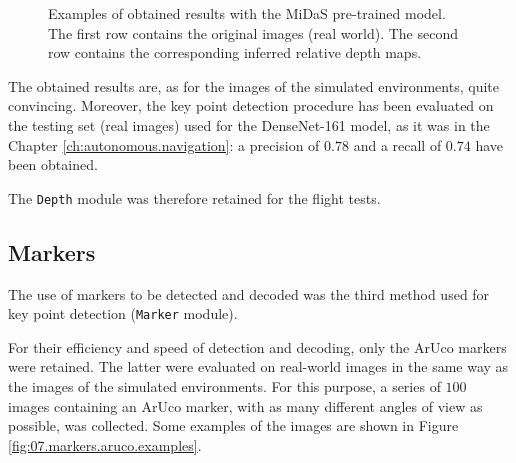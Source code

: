 \begin{figure}[H]
\begin{subfigure}{0.32\textwidth}
    \end{subfigure}
    \caption{Examples of obtained results with the MiDaS pre-trained model. The first row contains the original images (real world). The second row contains the corresponding inferred relative depth maps.}
    \label{fig:07.depth.results.examples}
\end{figure}

The obtained results are, as for the images of the simulated environments, quite convincing. Moreover, the key point detection procedure has been evaluated on the testing set (real images) used for the DenseNet-161 model, as it was in the Chapter \ref{ch:autonomous.navigation}: a precision of $\num{0.78}$ and a recall of $\num{0.74}$ have been obtained.

The \texttt{Depth} module was therefore retained for the flight tests.

\subsection{Markers}

The use of markers to be detected and decoded was the third method used for key point detection (\texttt{Marker} module).

For their efficiency and speed of detection and decoding, only the ArUco markers were retained. The latter were evaluated on real-world images in the same way as the images of the simulated environments. For this purpose, a series of $\num{100}$ images containing an ArUco marker, with as many different angles of view as possible, was collected. Some examples of the images are shown in Figure \ref{fig:07.markers.aruco.examples}.


